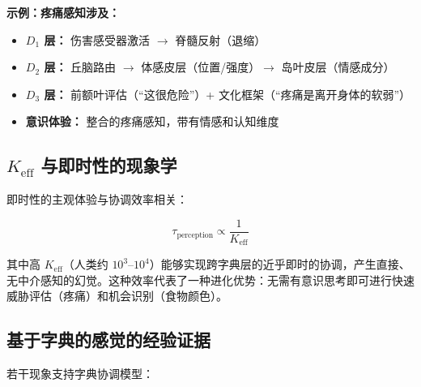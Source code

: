 \documentclass[12pt,a4paper]{article}
\newcommand{\eff}{\mathrm{eff}}
\newcommand{\Ke}{K_{\eff}}
\begin{document}
	\textbf{示例：疼痛感知涉及：}
	\begin{itemize}
		\item \textbf{$D_1$ 层：} 伤害感受器激活 $\rightarrow$ 脊髓反射（退缩）
		\item \textbf{$D_2$ 层：} 丘脑路由 $\rightarrow$ 体感皮层（位置/强度）$\rightarrow$ 岛叶皮层（情感成分）
		\item \textbf{$D_3$ 层：} 前额叶评估（“这很危险”）+ 文化框架（“疼痛是离开身体的软弱”）
		\item \textbf{意识体验：} 整合的疼痛感知，带有情感和认知维度
	\end{itemize}
	
	\subsection{$\Ke$ 与即时性的现象学}
	
	即时性的主观体验与协调效率相关：
	
	\[
	\tau_{\text{perception}} \propto \frac{1}{\Ke}
	\]
	
	其中高 $\Ke$（人类约 $10^3$–$10^4$）能够实现跨字典层的近乎即时的协调，产生直接、无中介感知的幻觉。这种效率代表了一种进化优势：无需有意识思考即可进行快速威胁评估（疼痛）和机会识别（食物颜色）。
	
	\subsection{基于字典的感觉的经验证据}
	
	若干现象支持字典协调模型：
	
\end{document}
